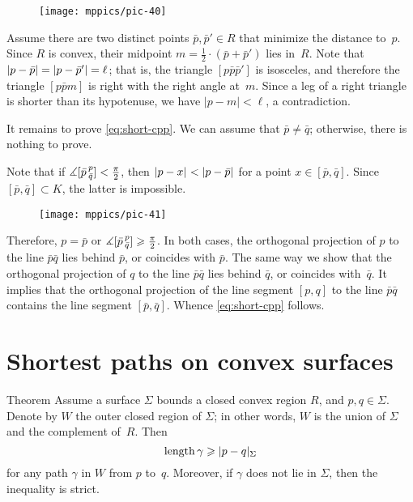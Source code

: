 {{

\begin{wrapfigure}{l}{22 mm}
\vskip-0mm
\centering
\texttt{[image: mppics/pic-40]}
\vskip-0mm
\end{wrapfigure}

Assume there are two distinct points $\bar p, \bar p'\in R$ that minimize the distance to~$p$.
Since $R$ is convex, their midpoint $m=\tfrac12\cdot (\bar p+\bar p')$ lies in~$R$.
Note that $|p-\bar p|\z=|p-\bar p'|=\ell$;
that is, the triangle $[p\bar p\bar p']$ is isosceles, and therefore the triangle $[p\bar p m]$ is right with the right angle at~$m$.
Since a leg of a right triangle is shorter than its hypotenuse, we have $|p-m|<\ell$, a contradiction. 

It remains to prove \ref{eq:short-cpp}.
We can assume that $\bar p\ne\bar q$; otherwise, there is nothing to prove.

}

Note that if $\measuredangle [\bar p\,{}^{p}_{\bar q}]< \tfrac\pi2$, then $\dist{p}{x}{}\z<\dist{p}{\bar p}{}$ for a point $x\in [\bar p,\bar q]$.
Since $[\bar p,\bar q]\subset K$,
the latter is impossible.
{

\begin{wrapfigure}{r}{37 mm}
\vskip-4mm
\centering
\texttt{[image: mppics/pic-41]}
\vskip-0mm
\end{wrapfigure}

Therefore, $p=\bar p$ or $\measuredangle [\bar p\,{}^{p}_{\bar q}]\geqslant \tfrac\pi2$.
In both cases, the orthogonal projection of $p$ to the line $\bar p\bar q$ lies behind $\bar p$, or coincides with $\bar p$.
The same way we show that the orthogonal projection of $q$ to the line $\bar p\bar q$ lies behind $\bar q$, or coincides with~$\bar q$.
It implies that the orthogonal projection of the line segment $[p,q]$ to the line $\bar p\bar q$ contains the line segment $[\bar p,\bar q]$.
Whence \ref{eq:short-cpp} follows.
\qeds

}

\section{Shortest paths on convex surfaces}

\begin{thm}{Theorem}\label{thm:shorts+convex}
Assume a surface $\Sigma$ bounds a closed convex region $R$, and $p,q\in \Sigma$.
Denote by $W$ the outer closed region of $\Sigma$;
in other words, $W$ is the union of $\Sigma$ and the complement of~$R$.
Then 
\[\length\gamma\ge \dist{p}{q}\Sigma\]
for any path $\gamma$ in $W$ from $p$ to~$q$.
Moreover, if  $\gamma$ does not lie in $\Sigma$, then the inequality is strict.
\end{thm}

}
